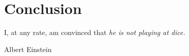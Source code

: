 
\chapter{Conclusion}
\label{chap:intro}
\epigraph{I, at any rate, am convinced that \it{he} is not playing at dice. }{Albert Einstein}
\lipsum[1-10]
